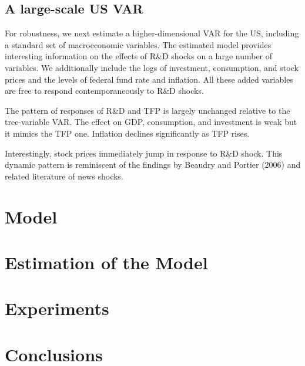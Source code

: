\documentclass{article}
\begin{document}
\subsection*{A large-scale US VAR}

For robustness, we next estimate a higher-dimensional VAR for the US, including a standard set of macroeconomic variables. The estimated model provides interesting information on the effects of R\&D shocks on a large number of variables. We additionally include the logs of investment, consumption, and stock prices and the levels of federal fund rate and inflation. All these added variables are free to respond contemporaneously to R\&D shocks.

The pattern of responses of R\&D and TFP is largely unchanged relative to the tree-variable VAR. The effect on GDP, consumption, and investment is weak but it mimics the TFP one. Inflation declines significantly as TFP rises.

Interestingly, stock prices immediately jump in response to R\&D shock. This dynamic pattern is reminiscent of the findings by Beaudry and Portier (2006) and related literature of news shocks.


\section{Model}

\section{Estimation of the Model}

\section{Experiments}

\section{Conclusions}
\end{document}
